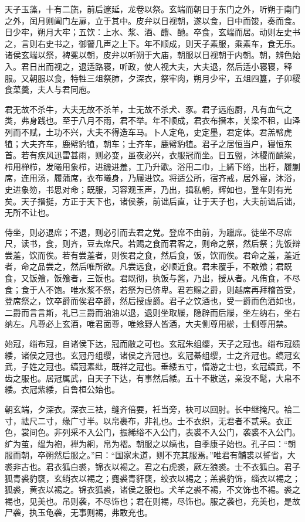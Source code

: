 \documentclass[]{article}
\begin{document}
天子玉藻，十有二旒，前后邃延，龙卷以祭。玄端而朝日于东门之外，听朔于南门之外，闰月则阖门左扉，立于其中。皮弁以日视朝，遂以食，日中而馂，奏而食。日少牢，朔月大牢；五饮：上水、浆、酒、醴、酏。卒食，玄端而居。动则左史书之，言则右史书之，御瞽几声之上下。年不顺成，则天子素服，乘素车，食无乐。诸侯玄端以祭，裨冕以朝，皮弁以听朔于大庙，朝服以日视朝于内朝。朝，辨色始入。君日出而视之，退适路寝，听政，使人视大夫，大夫退，然后适小寝寝，释服。又朝服以食，特牲三俎祭肺，夕深衣，祭牢肉，朔月少牢，五俎四簋，子卯稷食菜羹，夫人与君同庖。

君无故不杀牛，大夫无故不杀羊，士无故不杀犬、豕。君子远庖厨，凡有血气之类，弗身践也。至于八月不雨，君不举。年不顺成，君衣布搢本，关梁不租，山泽列而不赋，土功不兴，大夫不得造车马。卜人定龟，史定墨，君定体。君羔幦虎犆；大夫齐车，鹿幦豹犆，朝车；士齐车，鹿幦豹犆。君子之居恒当户，寝恒东首。若有疾风迅雷甚雨，则必变，虽夜必兴，衣服冠而坐。日五盥，沐稷而靧粱，栉用椫栉，发曦用象栉，进禨进羞，工乃升歌。浴用二巾，上絺下绤，出杅，履蒯席，连用汤，履蒲席，衣布曦身，乃屦进饮。将适公所，宿齐戒，居外寝，沐浴，史进象笏，书思对命；既服，习容观玉声，乃出，揖私朝，辉如也，登车则有光矣。天子搢挺，方正于天下也，诸侯荼，前诎后直，让于天子也，大夫前诎后诎，无所不让也。

侍坐，则必退席；不退，则必引而去君之党。登席不由前，为躐席。徒坐不尽席尺，读书，食，则齐，豆去席尺。若赐之食而君客之，则命之祭，然后祭；先饭辩尝羞，饮而俟。若有尝羞者，则俟君之食，然后食，饭，饮而俟。君命之羞，羞近者，命之品尝之，然后唯所欲。凡尝远食，必顺近食。君未覆手，不敢飧；君既食，又饭飧，饭飧者，三饭也。君既彻，执饭与酱，乃出，授从者。凡侑食，不尽食；食于人不饱。唯水浆不祭，若祭为已侪卑。君若赐之爵，则越席再拜稽首受，登席祭之，饮卒爵而俟君卒爵，然后授虚爵。君子之饮酒也，受一爵而色洒如也，二爵而言言斯，礼已三爵而油油以退，退则坐取屦，隐辟而后屦，坐左纳右，坐右纳左。凡尊必上玄酒，唯君面尊，唯飨野人皆酒，大夫侧尊用棜，士侧尊用禁。

始冠，缁布冠，自诸侯下达，冠而敝之可也。玄冠朱组缨，天子之冠也。缁布冠缋緌，诸侯之冠也。玄冠丹组缨，诸侯之齐冠也。玄冠綦组缨，士之齐冠也。缟冠玄武，子姓之冠也。缟冠素纰，既祥之冠也。垂緌五寸，惰游之士也，玄冠缟武，不齿之服也。居冠属武，自天子下达，有事然后緌。五十不散送，亲没不髦，大帛不緌。衣冠紫緌，自鲁桓公始也。

朝玄端，夕深衣。深衣三袪，缝齐倍要，衽当旁，袂可以回肘。长中继掩尺。袷二寸，祛尺二寸，缘广寸半。以帛裹布，非礼也。士不衣织，无君者不贰采。衣正色，裳间色。非列采不入公门，振絺绤不入公门，表裘不入公门，袭裘不入公门。纩为茧，缊为袍，褝为絅，帛为褶。朝服之以缟也，自季康子始也。孔子曰：``朝服而朝，卒朔然后服之。''曰：``国家未道，则不充其服焉。''唯君有黼裘以誓省，大裘非古也。君衣狐白裘，锦衣以裼之。君之右虎裘，厥左狼裘。士不衣狐白。君子狐青裘豹褎，玄绡衣以裼之；麑裘青豻褎，绞衣以裼之；羔裘豹饰，缁衣以裼之；狐裘，黄衣以裼之。锦衣狐裘，诸侯之服也。犬羊之裘不裼，不文饰也不裼。裘之裼也，见美也。吊则袭，不尽饰也；君在则裼，尽饰也。服之袭也，充美也，是故尸袭，执玉龟袭，无事则裼，弗敢充也。
\end{document}
